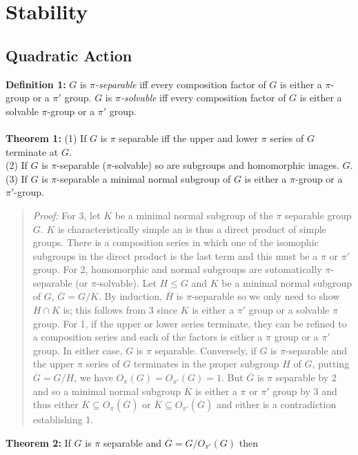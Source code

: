\chapter{Stability}
\section {Quadratic Action}
{\bf Definition 1:} 
$G$ is \emph{$\pi$-separable} iff every composition factor of $G$ is
either a $\pi$-group or a $\pi'$ group.
$G$ is \emph{$\pi$-solvable} iff every composition factor of $G$ is
either a solvable $\pi$-group or a $\pi'$ group.
\\
\\
{\bf Theorem 1:}
(1) If $G$ is $\pi$ separable iff the upper and lower $\pi$ series of $G$ terminate at
$G$.\\
(2) If $G$ is $\pi$-separable ($\pi$-solvable) so are subgroups and homomorphic images.
$G$.\\
(3) If $G$ is $\pi$-separable a minimal normal subgroup of $G$ is either a 
$\pi$-group or a
$\pi'$-group.
\begin{quote}
\emph{Proof:}  
For 3,
let $K$ be a minimal normal subgroup of the $\pi$ separable group $G$.
$K$ is characteristically simple an is thus a direct product of simple groups.
There is a composition series in which one of the isomophic subgroups in the
direct product is the last term and this must be a $\pi$ or $\pi'$ group.
For 2, homomorphic and normal subgroups are sutomatically $\pi$-separable (or $\pi$-solvable).
Let $H \le G$ and $K$ be a minimal normal subgroup of $G$, ${\overline G}= G/K$.
By induction, ${\overline H}$ is $\pi$-separable so we only need to show $H \cap K$ is;
this follows from 3 since $K$ is either a $\pi'$ group or a solvable $\pi$ group.
For 1, if the upper or lower series terminate, they can be refined to a composition series and
each of the factors is either a $\pi$ group or a $\pi'$ group. 
In either case, $G$ is $\pi$ separable.
Conversely, if $G$ is $\pi$-separable and the upper $\pi$ series of $G$ terminates in
the proper subgroup $H$ of $G$, putting ${\overline G}= G/H$, we have 
$O_{\pi}(G) = O_{\pi'}(G)= 1 $. But ${\overline G}$ is $\pi$ separable by 2 and so a minimal
normal subgroup ${\overline K}$ is either a $\pi$ or $\pi'$ group by 3 and thus either
${\overline K} \subseteq O_{\pi}({\overline G})$ or
${\overline K} \subseteq O_{\pi'}({\overline G})$ and either is a contradiction establishing 1.
\end{quote}
{\bf Theorem 2:}
If $G$ is $\pi$ separable and ${\overline G}= G/O_{\pi'}(G)$ then

